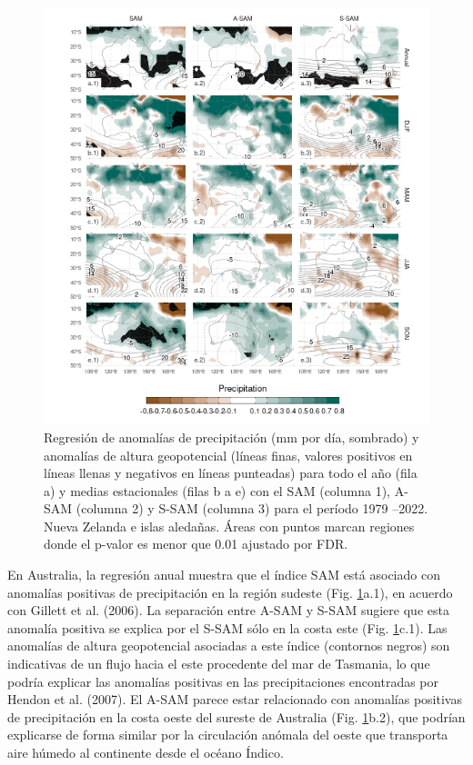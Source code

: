\documentclass[12pt,oneside]{reedthesis}
\begin{document}
\begin{figure}
\includegraphics{figures/30-sam/pp-regr-oceania-1} \caption{Regresión de anomalías de precipitación (mm por día, sombrado) y anomalías de altura geopotencial (líneas finas, valores positivos en líneas llenas y negativos en líneas punteadas) para todo el año (fila a) y medias estacionales (filas b a e) con el SAM (columna 1), A-SAM (columna 2) y S-SAM (columna 3) para el período 1979 --2022.
Nueva Zelanda e islas aledañas.
Áreas con puntos marcan regiones donde el p-valor es menor que 0.01 ajustado por FDR.}\label{fig:pp-regr-oceania}
\end{figure}

En Australia, la regresión anual muestra que el índice SAM está asociado con anomalías positivas de precipitación en la región sudeste (Fig. \ref{fig:pp-regr-oceania}a.1), en acuerdo con Gillett et al. (2006).
La separación entre A-SAM y S-SAM sugiere que esta anomalía positiva se explica por el S-SAM sólo en la costa este (Fig. \ref{fig:pp-regr-oceania}c.1).
Las anomalías de altura geopotencial asociadas a este índice (contornos negros) son indicativas de un flujo hacia el este procedente del mar de Tasmania, lo que podría explicar las anomalías positivas en las precipitaciones encontradas por Hendon et al. (2007).
El A-SAM parece estar relacionado con anomalías positivas de precipitación en la costa oeste del sureste de Australia (Fig. \ref{fig:pp-regr-oceania}b.2), que podrían explicarse de forma similar por la circulación anómala del oeste que transporta aire húmedo al continente desde el océano Índico.
\end{document}
